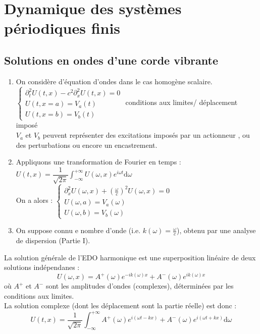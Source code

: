 \documentclass[12pt,a4paper]{article}
\begin{document}
\newpage
	
\section{Dynamique des systèmes périodiques finis}
\subsection{Solutions en ondes d'une corde vibrante}
\begin{enumerate}[label=$\cdot$]
	\item On considère d'équation d'ondes dans le cas homogène scalaire.\\
$\begin{cases}
	\partial_t^2 U(t,x) -c^2\partial_x^2 U(t,x) = 0 \\
	U(t,x=a) = V_a(t)\\
	U(t,x=b) = V_b(t)
\end{cases}$ conditions aux limites/ déplacement imposé\\

$V_a$ et $V_b$ peuvent représenter des excitations imposés par un actionneur , ou des perturbations ou encore un encastrement.

	\item Appliquons une transformation de Fourier en temps :$U(t,x) = \dfrac1{\sqrt{2\pi}}\displaystyle\int_{-\infty}^{+\infty} U(\omega,x)e^{i\omega t}\mathrm d\omega$\\
	On a alors : $\begin{cases}
		\partial_x^2 U(\omega,x)+\left(\frac\omega c\right)^2U(\omega,x) = 0 \\
		U(\omega,a) = V_a(\omega)\\
		U(\omega,b) = V_b(\omega)
	\end{cases}$
	
	\item On suppose connu e nombre d'onde (i.e. $k(\omega)=\frac\omega c$), obtenu par une analyse de dispersion (Partie I).
\end{enumerate}
	
La solution générale de l'EDO harmonique est une superposition linéaire de deux solutions indépendanes : 
\[
U(\omega,x) = A^+(\omega)e^{-ik(\omega)x} + A^-(\omega)e^{ik(\omega)x}
\]
où $A^+$ et $A^-$ sont les amplitudes d'ondes (complexes), déterminées par les conditions aux limites.\\
La solution complexe (dont les déplacement sont la partie réelle) est donc :
\[
U(t,x) = \dfrac1{\sqrt{2\pi}}\displaystyle\int_{-\infty}^{+\infty}A^+(\omega)e^{i(\omega t-kx)}+A^-(\omega)e^{i(\omega t+ kx)}\mathrm d\omega
\]
\end{document}
